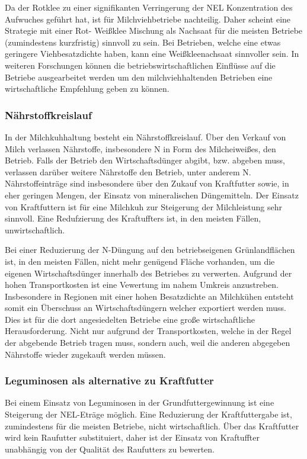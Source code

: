 Da der Rotklee zu einer signifikanten Verringerung der \ac{NEL} Konzentration des Aufwuches geführt hat, ist für Milchviehbetriebe nachteilig.
Daher scheint eine Strategie mit einer Rot- Weißklee Mischung als Nachsaat für die meisten Betriebe (zumindestens kurzfristig) sinnvoll zu sein.
Bei Betrieben, welche eine etwas geringere Viehbesatzdichte haben, kann eine Weißkleenachsaat sinnvoller sein.
In weiteren Forschungen können die betriebswirtschaftlichen Einflüsse auf die Betriebe ausgearbeitet werden um den milchviehhaltenden Betrieben eine wirtschaftliche Empfehlung geben zu können.

\subsubsection{Nährstoffkreislauf}
\label{subsub:nährstoffkreislauf}

In der Milchkuhhaltung besteht ein Nährstoffkreislauf.
Über den Verkauf von Milch verlassen Nährstoffe, insbesondere N in Form des Milcheiweißes, den Betrieb.
Falls der Betrieb den Wirtschaftsdünger abgibt, bzw. abgeben muss, verlassen darüber weitere Nährstoffe den Betrieb, unter anderem N.
Nährstoffeinträge sind insbesondere über den Zukauf von Kraftfutter sowie, in eher geringen Mengen, der Einsatz von mineralischen Düngemitteln.
Der Einsatz von Kraftfuttern ist für eine Milchkuh zur Steigerung der Milchleistung sehr sinnvoll.
Eine Redufzierung des Kraftuffters ist, in den meisten Fällen, unwirtschaftlich.

Bei einer Reduzierung der N-Düngung auf den betriebseigenen Grünlandflächen ist, in den meisten Fällen, nicht mehr genügend Fläche vorhanden, um die eigenen Wirtschaftsdünger innerhalb des Betriebes zu verwerten.
Aufgrund der hohen Transportkosten ist eine Vewertung im nahem Umkreis anzustreben.
Insbesondere in Regionen mit einer hohen Besatzdichte an Milchkühen entsteht somit ein Überschuss an Wirtschaftsdüngern welcher exportiert werden muss.
Dies ist für die dort angesiedelten Betriebe eine große wirtschaftliche Herausforderung.
Nicht nur aufgrund der Transportkosten, welche in der Regel der abgebende Betrieb tragen muss, sondern auch, weil die anderen abgegeben Nährstoffe wieder zugekauft werden müssen.

\subsubsection{Leguminosen als alternative zu Kraftfutter}
\label{subsub:alternative}
Bei einem Einsatz von Leguminosen in der Grundfuttergewinnung ist eine Steigerung der \ac{NEL}-Eträge möglich.
Eine Reduzierung der Kraftfuttergabe ist, zumindestens für die meisten Betriebe, nicht wirtschaftlich.
Über das Kraftfutter wird kein Raufutter substituiert, daher ist der Einsatz von Kraftuffter unabhängig von der Qualität des Raufutters zu bewerten.

